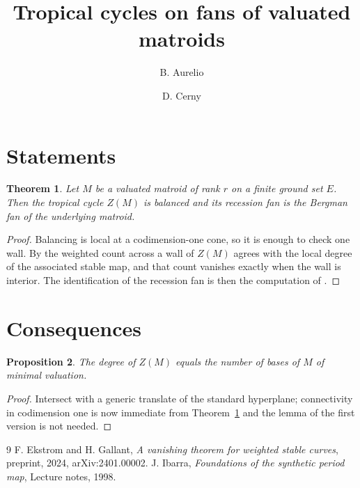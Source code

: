 \documentclass{article}
\title{Tropical cycles on fans of valuated matroids}
\author{B. Aurelio \and D. Cerny}
\newtheorem{theorem}{Theorem}[section]
\newtheorem{proposition}[theorem]{Proposition}
\begin{document}
\maketitle

\section{Statements}

\begin{theorem}\label{thm:main}
Let $M$ be a valuated matroid of rank $r$ on a finite ground set $E$. Then the tropical cycle $Z(M)$ is balanced and its recession fan is the Bergman fan of the underlying matroid.
\end{theorem}

\begin{proof}
Balancing is local at a codimension-one cone, so it is enough to check one wall. By \cite[Theorem 1.1]{other} the weighted count across a wall of $Z(M)$ agrees with the local degree of the associated stable map, and that count vanishes exactly when the wall is interior. The identification of the recession fan is then the computation of \cite{third}.
\end{proof}

\section{Consequences}

\begin{proposition}\label{prop:degree}
The degree of $Z(M)$ equals the number of bases of $M$ of minimal valuation.
\end{proposition}

\begin{proof}
Intersect with a generic translate of the standard hyperplane; connectivity in codimension one is now immediate from Theorem~\ref{thm:main} and the lemma of the first version is not needed.
\end{proof}

\begin{thebibliography}{9}
 F. Ekstrom and H. Gallant, \emph{A vanishing theorem for weighted stable curves}, preprint, 2024, arXiv:2401.00002.
 J. Ibarra, \emph{Foundations of the synthetic period map}, Lecture notes, 1998.
\end{thebibliography}
\end{document}
